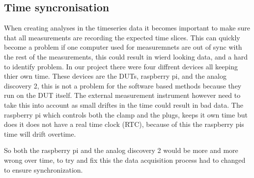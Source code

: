 \subsection{Time syncronisation}
When creating analyses in the timeseries data it becomes important to make sure that all measurements are recording the expected time slices. This can quickly become a problem if one computer used for measuremnets are out of sync with the rest of the measurements, this could result in wierd looking data, and a hard to identify problem. In our project there were four diffrent devices all keeping thier own time. These devices are the DUTs, raspberry pi, and the analog discovery 2, this is not a problem for the software based methods because they run on the DUT itself. The external measurement instrument however need to take this into account as small driftes in the time could result in bad data. The raspberry pi which controls both the clamp and the plugs, keeps it own time but does it does not have a real time clock (RTC)\cite{RTCRasp}, because of this the raspberry pis time will drift overtime. 

So both the raspberry pi and the analog discovery 2 would be more and more wrong over time, to try and fix this the data acquisition process had to changed to ensure synchronization. 